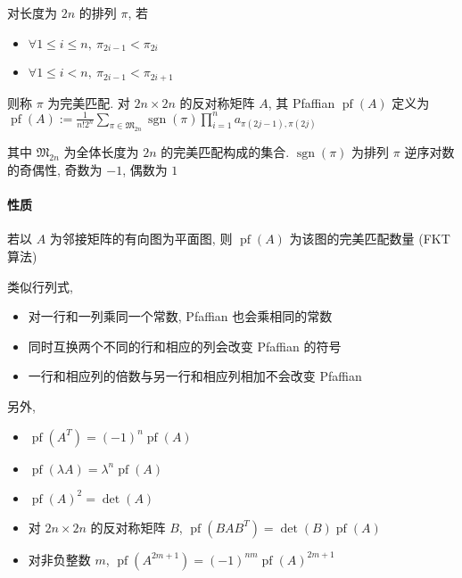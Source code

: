 对长度为 \(2n\) 的排列 \(\pi\), 若

\begin{itemize}
    \item \(\forall 1\le i\le n,~\pi_{2i-1}<\pi_{2i}\)
    \item \(\forall 1\le i< n,~\pi_{2i-1}<\pi_{2i+1}\)
\end{itemize}

则称 \(\pi\) 为完美匹配. 对 \(2n\times 2n\) 的反对称矩阵 \(A\), 其 Pfaffian \(\operatorname{pf}(A)\) 定义为 \(\displaystyle\operatorname{pf}(A):=\frac{1}{n!2^n}\sum_{\pi\in \mathfrak{M}_{2n}}\operatorname{sgn}(\pi)\prod_{i=1}^n a_{\pi(2j-1),\pi(2j)}\)

其中 \(\mathfrak{M}_{2n}\) 为全体长度为 \(2n\) 的完美匹配构成的集合. \(\operatorname{sgn}(\pi)\) 为排列 \(\pi\) 逆序对数的奇偶性, 奇数为 \(-1\), 偶数为 \(1\)

\paragraph{性质}

若以 \(A\) 为邻接矩阵的有向图为平面图, 则 \(\operatorname{pf}(A)\) 为该图的完美匹配数量 (FKT 算法)

类似行列式, 

\begin{itemize}
    \item 对一行和一列乘同一个常数, Pfaffian 也会乘相同的常数
    \item 同时互换两个不同的行和相应的列会改变 Pfaffian 的符号
    \item 一行和相应列的倍数与另一行和相应列相加不会改变 Pfaffian
\end{itemize}

另外,

\begin{itemize}
    \item \(\operatorname{pf}\left(A^T\right)=(-1)^n\operatorname{pf}(A)\)
    \item \(\operatorname{pf}(\lambda A)=\lambda^n\operatorname{pf}(A)\)
    \item \(\operatorname{pf}(A)^2=\operatorname{det}(A)\)
    \item 对 \(2n\times 2n\) 的反对称矩阵 \(B\), \(\operatorname{pf}\left(BAB^T\right)=\operatorname{det}(B)\operatorname{pf}(A)\)
    \item 对非负整数 \(m\), \(\operatorname{pf}\left(A^{2m+1}\right)=(-1)^{nm}\operatorname{pf}(A)^{2m+1}\)
\end{itemize}

